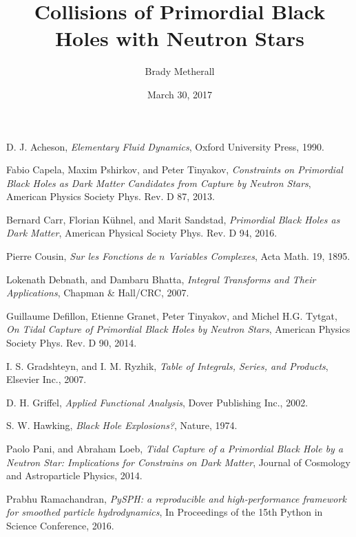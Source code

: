 \documentclass{jthesis}
\title{Collisions of Primordial Black Holes with Neutron Stars} %
\author{Brady Metherall}
\date{March 30, 2017}
\begin{document}
\maketitle



\makedeclaration

\maketableofcontents

\doublespacing
\linespread{2}









\begin{thebibliography}{99}

D. J. Acheson, \emph{Elementary Fluid Dynamics}, Oxford University Press, 1990.

Fabio Capela, Maxim Pshirkov, and Peter Tinyakov, \emph{Constraints on Primordial Black Holes as Dark Matter Candidates from Capture by Neutron Stars}, American Physics Society Phys. Rev. D 87, 2013.

Bernard Carr, Florian K{\"u}hnel, and Marit Sandstad, \emph{Primordial Black Holes as Dark Matter}, American Physical Society Phys. Rev. D 94, 2016.

Pierre Cousin, \emph{Sur les Fonctions de $n$ Variables Complexes}, Acta Math. 19, 1895.

Lokenath Debnath, and Dambaru Bhatta, \emph{Integral Transforms and Their Applications}, Chapman \& Hall/CRC, 2007.

Guillaume Defillon, Etienne Granet, Peter Tinyakov, and Michel H.G. Tytgat, \emph{On Tidal Capture of Primordial Black Holes by Neutron Stars}, American Physics Society Phys. Rev. D 90, 2014.

I. S. Gradshteyn, and I. M. Ryzhik, \emph{Table of Integrals, Series, and Products}, Elsevier Inc., 2007.

D. H. Griffel, \emph{Applied Functional Analysis}, Dover Publishing Inc., 2002.

S. W. Hawking, \emph{Black Hole Explosions?}, Nature, 1974.

Paolo Pani, and Abraham Loeb, \emph{Tidal Capture of a Primordial Black Hole by a Neutron Star: Implications for Constrains on Dark Matter}, Journal of Cosmology and Astroparticle Physics, 2014.

Prabhu Ramachandran, \emph{PySPH: a reproducible and high-performance framework for smoothed particle hydrodynamics}, In Proceedings of the 15th Python in Science Conference, 2016.




\end{thebibliography}

%
%
\end{document}

